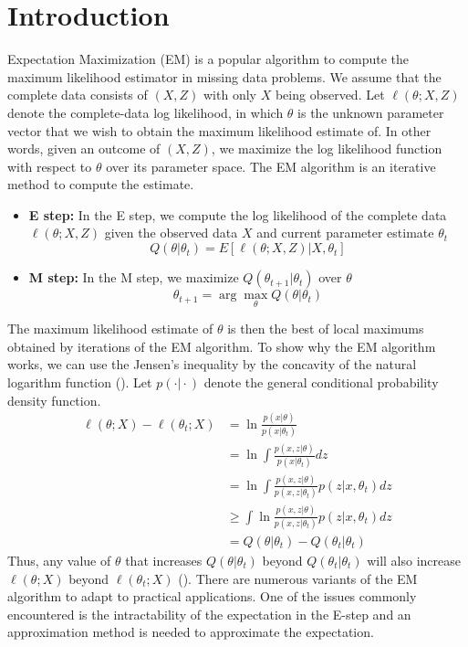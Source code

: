 \documentclass[11pt]{article}
\begin{document}
	\section{Introduction}
	Expectation Maximization (EM) is a popular algorithm to compute the maximum likelihood estimator in missing data problems. We assume that the complete data consists of $(X, Z)$ with only $X$ being observed. Let $\ell(\theta; X, Z)$ denote the complete-data log likelihood, in which $\theta$ is the unknown parameter vector that we wish to obtain the maximum likelihood estimate of. In other words, given an outcome of $(X, Z)$, we maximize the log likelihood function with respect to $\theta$ over its parameter space. The EM algorithm is an iterative method to compute the estimate.
	\begin{itemize}
		\item \textbf{E step:} In the E step, we compute the log likelihood of the complete data $\ell(\theta; X, Z)$ given the observed data $X$ and current parameter estimate $\theta_t$
		\begin{equation}
			Q(\theta \vert \theta_t) = E [\ell(\theta; X, Z) \vert X, \theta_t]
		\end{equation}
		\item \textbf{M step:} In the M step, we maximize $Q(\theta_{t+1} \vert \theta_t)$ over $\theta$ 
		\begin{equation}
			\theta_{t+1} = \arg \max_\theta Q(\theta \vert \theta_t)
		\end{equation}
	\end{itemize}
	The maximum likelihood estimate of $\theta$ is then the best of local maximums obtained by iterations of the EM algorithm. To show why the EM algorithm works, we can use the Jensen's inequality by the concavity of the natural logarithm function (\cite{roche2011algorithm}). Let $p(\cdot \vert \cdot)$ denote the general conditional probability density function.
	\begin{equation}
		\begin{split}
			\ell(\theta; X) - \ell (\theta_t; X)
			& = \ln \frac{p(x\vert \theta)}{p( x \vert \theta_t) } \\
			& = \ln \int \frac{p(x, z\vert \theta)}{p( x \vert \theta_t)} dz\\
			& = \ln \int \frac{p(x, z\vert \theta)}{p( x,z \vert \theta_t)} p(z \vert x, \theta_t) dz \\
			& \geq \int \ln \frac{p(x, z\vert \theta)}{p( x,z \vert \theta_t)} p(z \vert x, \theta_t) dz \\
			& = Q(\theta \vert \theta_t) - Q(\theta_t \vert \theta_t)
		\end{split}
	\end{equation}
	Thus, any value of $\theta$ that increases $Q(\theta \vert \theta_t)$ beyond $Q(\theta_t \vert \theta_t)$ will also increase $\ell(\theta; X)$ beyond $\ell(\theta_t; X)$ (\cite{roche2011algorithm}). There are numerous variants of the EM algorithm to adapt to practical applications. One of the issues commonly encountered is the intractability of the expectation in the E-step and an approximation method is needed to approximate the expectation. 
	
\end{document}
